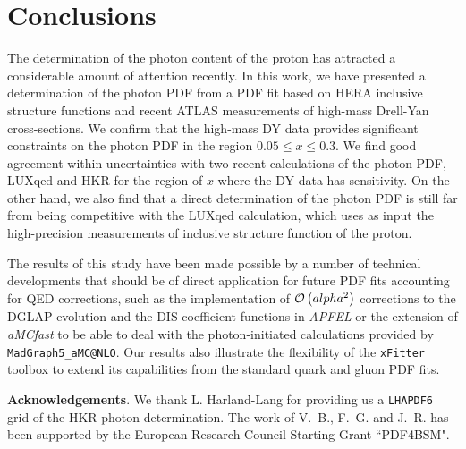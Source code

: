 \section{Conclusions}

\label{sec:conclusions}

The determination of the photon content of the proton has
attracted a considerable amount of attention recently.
%
In this work, we have presented a determination of the photon PDF from
a PDF fit based on HERA inclusive structure functions and recent ATLAS measurements
of high-mass Drell-Yan cross-sections.
%
We confirm that the high-mass DY data provides significant constraints on the photon PDF
in the region $0.05 \le x \le 0.3$.
%
We find good agreement within uncertainties with two recent calculations of the photon PDF,
LUXqed and HKR for the region of $x$ where the DY data has sensitivity.
%
On the other hand, we also find that a direct determination of the photon PDF
is still far from being competitive with the LUXqed calculation, which uses as input
the high-precision measurements of inclusive structure function of the proton.

The results of this study have been made possible by a number of technical developments
that should be of direct application for future PDF fits accounting for QED corrections,
such as the implementation of $\mathcal{O}\left( alpha^2\right)$ corrections to the DGLAP
evolution and the DIS coefficient functions in {\it APFEL} or the extension of
{\it aMCfast} to be able to deal with the photon-initiated calculations provided
by {\tt MadGraph5\_aMC@NLO}.
%
Our results also illustrate the flexibility of the {\tt xFitter} toolbox to extend
its capabilities from the standard quark and gluon PDF fits.


{\bf Acknowledgements}.
%
We thank L. Harland-Lang for providing us a {\tt LHAPDF6} grid
of the HKR photon determination.
%
The work of V.~B., F.~G. and J.~R. has been supported
by the European Research Council Starting Grant ``PDF4BSM".



